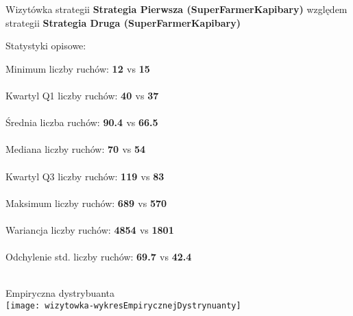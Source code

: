 \documentclass{article}
\begin{document}
\thispagestyle{empty}

\begin{center}
{\large Wizytówka strategii {\color[HTML]{1D77A8} \textbf{ Strategia Pierwsza (SuperFarmerKapibary) }} względem strategii {\color[HTML]{999999} \textbf{ Strategia Druga (SuperFarmerKapibary) }}}\end{center}
\vspace*{3mm}
\begin{multicols}{3}

\begin{center}
{\large Statystyki opisowe:}
\end{center}
Minimum liczby ruchów: \hfill {\textbf {\color[HTML]{1D77A8} { \LARGE  12 }}} vs {\textbf {\color[HTML]{999999} { \Large  15 }}}\\\\Kwartyl Q1 liczby ruchów: \hfill {\textbf {\color[HTML]{1D77A8} { \LARGE  40 }}} vs {\textbf {\color[HTML]{999999} { \Large  37 }}}\\\\Średnia liczba ruchów: \hfill {\textbf {\color[HTML]{1D77A8} { \LARGE  90.4 }}} vs {\textbf {\color[HTML]{999999} { \Large  66.5 }}}\\\\Mediana liczby ruchów: \hfill {\textbf {\color[HTML]{1D77A8} { \LARGE  70 }}} vs {\textbf {\color[HTML]{999999} { \Large  54 }}}\\\\Kwartyl Q3 liczby ruchów: \hfill {\textbf {\color[HTML]{1D77A8} { \LARGE  119 }}} vs {\textbf {\color[HTML]{999999} { \Large  83 }}}\\\\Maksimum liczby ruchów: \hfill {\textbf {\color[HTML]{1D77A8} { \LARGE  689 }}} vs {\textbf {\color[HTML]{999999} { \Large  570 }}}\\\\Wariancja liczby ruchów: \hfill {\textbf {\color[HTML]{1D77A8} { \LARGE  4854 }}} vs {\textbf {\color[HTML]{999999} { \Large  1801 }}}\\\\Odchylenie std. liczby ruchów: \hfill {\textbf {\color[HTML]{1D77A8} { \LARGE  69.7 }}} vs {\textbf {\color[HTML]{999999} { \Large  42.4 }}}\\\\
\begin{center}
{\large Empiryczna dystrybuanta}\\

\texttt{[image: wizytowka-wykresEmpirycznejDystrynuanty]}
\end{center}


\end{multicols}
\end{document}
